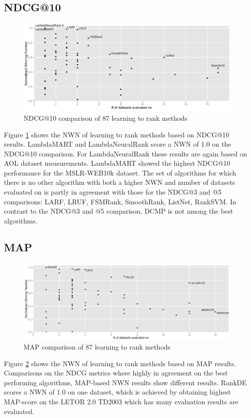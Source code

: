 \documentclass{sig-alternate}
\begin{document}
\subsection{NDCG@10}
\begin{figure}
\centering
\includegraphics[scale=0.19]{gfx/ndcg10_winnum}
\caption{NDCG@10 comparison of 87 learning to rank methods}
\label{fig:normalized_winning_number_ndcg10}
\end{figure}

Figure \ref{fig:normalized_winning_number_ndcg10} shows the NWN of learning to rank methods based on NDCG@10 results. LambdaMART and LambdaNeuralRank score a NWN of 1.0 on the NDCG@10 comparison. For LambdaNeuralRank these results are again based on AOL dataset measurements. LambdaMART showed the highest NDCG@10 performance for the MSLR-WEB10k dataset. The set of algorithms for which there is no other algorithm with both a higher NWN and number of datasets evaluated on is partly in agreement with those for the NDCG@3 and @5 comparisons: {LARF, LRUF, FSMRank, SmoothRank, ListNet, RankSVM}. In contrast to the NDCG@3 and @5 comparison, DCMP is not among the best algorithms.

\subsection{MAP}
\begin{figure}
\centering
\includegraphics[scale=0.19]{gfx/map_winnum}
\caption{MAP comparison of 87 learning to rank methods}
\label{fig:normalized_winning_number_map}
\end{figure}
Figure \ref{fig:normalized_winning_number_map} shows the NWN of learning to rank methods based on MAP results. Comparisons on the NDCG metrics where highly in agreement on the best performing algorithms, MAP-based NWN results show different results. RankDE scores a NWN of 1.0 on one dataset, which is achieved by obtaining highest MAP-score on the LETOR 2.0 TD2003 which has many evaluation results are evaluated.\\
\end{document}
